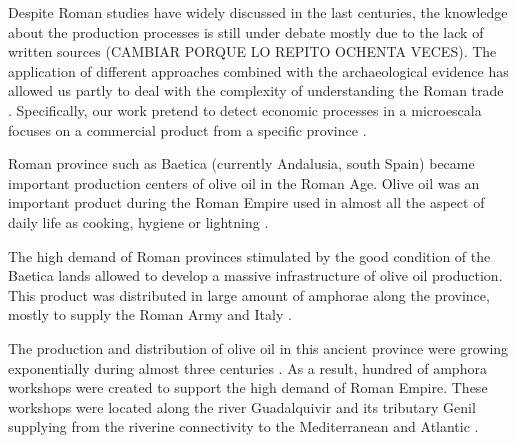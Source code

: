 \documentclass[review]{elsarticle}
\begin{document}

Despite Roman studies have widely discussed in the last centuries, the knowledge about the production processes is still under debate mostly due to the lack of written sources (CAMBIAR PORQUE LO REPITO OCHENTA VECES). The application of different approaches combined with the archaeological evidence has allowed us partly to deal with the complexity of understanding the Roman trade \citep{orengo_seeds_2016,brughmans_roman_2016,coto-sarmiento_maria_bayesian_????}. Specifically, our work pretend to detect economic processes in a microescala focuses on a commercial product from a specific province \citep{isaksen_network_2006}. 


Roman province such as Baetica (currently Andalusia, south Spain) became important production centers of olive oil in the Roman Age. Olive oil was an important product during the Roman Empire used in almost all the aspect of daily life as cooking, hygiene or lightning \citep{mattingly_d.j._oil_1988}. 

The high demand of Roman provinces stimulated by the good condition of the Baetica lands allowed to develop a massive infrastructure of olive oil production. This product was distributed in large amount of amphorae along the province, mostly to supply the Roman Army and Italy \citep{blazquez_exportacion_1980}. 

The production and distribution of olive oil in this ancient province were growing exponentially during almost three centuries \citep{remesal_concierto}. As a result, hundred of amphora workshops were created to support the high demand of Roman Empire. These workshops were located along the river Guadalquivir and its tributary Genil supplying from the riverine connectivity to the Mediterranean and Atlantic \citep{garcia_vargas_enrique_formal_2010}. 
\end{document}
